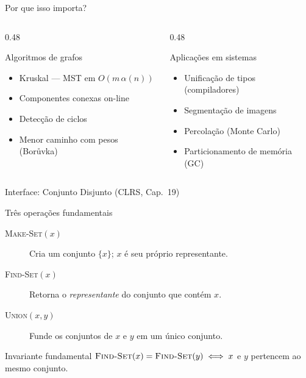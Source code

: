 \documentclass[aspectratio=169]{beamer}
\begin{document}
\begin{frame}{Por que isso importa?}%
  \begin{columns}[T]
    \begin{column}{0.48\textwidth}
      \begin{block}{Algoritmos de grafos}
        \begin{itemize}
          \item Kruskal — MST em $O(m\,\alpha(n))$
          \item Componentes conexas on-line
          \item Detecção de ciclos
          \item Menor caminho com pesos (Borůvka)
        \end{itemize}
      \end{block}
    \end{column}
    \begin{column}{0.48\textwidth}
      \begin{block}{Aplicações em sistemas}
        \begin{itemize}
          \item Unificação de tipos (compiladores)
          \item Segmentação de imagens
          \item Percolação (Monte Carlo)
          \item Particionamento de memória (GC)
        \end{itemize}
      \end{block}
    \end{column}
  \end{columns}
\end{frame}

\begin{frame}{Interface: Conjunto Disjunto (CLRS, Cap.\ 19)}%
  \begin{block}{Três operações fundamentais}
    \begin{description}
      \item[\textsc{Make-Set}$(x)$] Cria um conjunto $\{x\}$; $x$ é seu próprio representante.
      \item[\textsc{Find-Set}$(x)$] Retorna o \emph{representante} do conjunto que contém $x$.
      \item[\textsc{Union}$(x,y)$] Funde os conjuntos de $x$ e $y$ em um único conjunto.
    \end{description}
  \end{block}
  \vspace{0.4cm}
  \begin{alertblock}{Invariante fundamental}
    $\textsc{Find-Set}(x) = \textsc{Find-Set}(y) \iff x$ e $y$ pertencem ao mesmo conjunto.
  \end{alertblock}
\end{frame}
\end{document}
